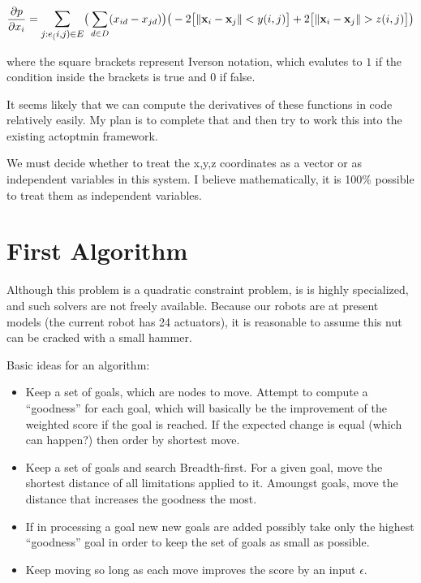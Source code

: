 \documentclass[11pt]{article}
\begin{document}
\begin{multline}
  \frac{\partial p}{\partial x_i}
  =  \mathlarger{\sum_{j:e_(i,j) \in E}}
  \big(\sum_{d \in D}(x_{id} - x_{jd})\big) \big(-2\big[\lVert \mathbf{x}_i - \mathbf{x}_j \rVert < y(i,j)\big]
  + 2\big[\lVert \mathbf{x}_i - \mathbf{x}_j \rVert > z(i,j)\big]\big)
\end{multline}

where the square brackets represent Iverson notation, which evalutes to $1$ if the condition
inside the brackets is true and $0$ if false.

It seems likely that we can compute the derivatives of these functions in code relatively easily.
My plan is to complete that and then try to work this into the existing actoptmin framework.

We must decide whether to treat the x,y,z coordinates as a vector or as independent variables in
this system. I believe mathematically, it is 100\% possible to treat them as independent variables.

\section{First Algorithm}

Although this problem is a quadratic constraint problem,
is is highly specialized, and such solvers are not
freely available. Because our robots are at present models
(the current robot has 24 actuators), it is
reasonable to assume this nut can be cracked with a small hammer.

Basic ideas for an algorithm:
\begin{itemize}
\item Keep a set of goals, which are nodes to move.  Attempt to compute a ``goodness''
  for each goal,
  which will basically be the improvement of the weighted score if the goal is reached. If the
  expected change is equal (which can happen?) then order by shortest move.
\item Keep a set of goals and search Breadth-first. For a given goal, move the shortest distance
  of all limitations applied to it.  Amoungst goals, move the distance that increases the goodness
  the most.
\item If in processing a goal new new goals are added possibly
  take only the highest ``goodness'' goal in order
  to keep the set of goals as small as possible.
  \item Keep moving so long as each move improves the score by an input $\epsilon$.
\end{itemize}
\end{document}
